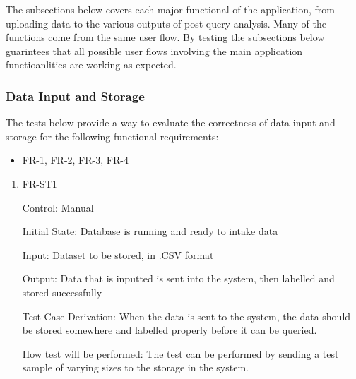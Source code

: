 \documentclass[12pt, titlepage]{article}
\begin{document}
The subsections below covers each major functional of the application, from
uploading data to the various outputs of post query analysis. Many of the
functions come from the same user flow. By testing the subsections below
guarintees that all possible user flows involving the main application
functioanlities are working as expected. 

\subsubsection{Data Input and Storage}
The tests below provide a way to evaluate the correctness of data input and
storage for the following functional requirements:
\begin{itemize}
  \item FR-1, FR-2, FR-3, FR-4
\end{itemize}

\begin{enumerate}

\item{FR-ST1}

Control: Manual
					
Initial State: Database is running and ready to intake data
					
Input: Dataset to be stored, in .CSV format
					
Output: Data that is inputted is sent into the system, then labelled and stored
successfully

Test Case Derivation: When the data is sent to the system, the data should be
stored somewhere and labelled properly before it can be queried.
					
How test will be performed: The test can be performed by sending a test sample
of varying sizes to the storage in the system.

\end{enumerate}
\end{document}
